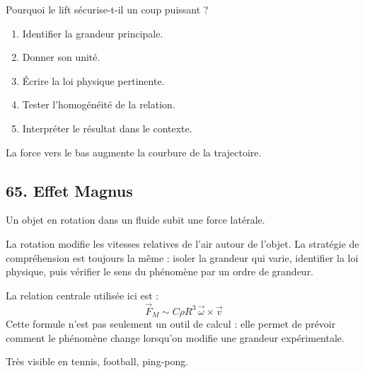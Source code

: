 \documentclass[11pt,a4paper]{article}
\begin{document}
\begin{exercicebox}
Pourquoi le lift sécurise-t-il un coup puissant ?
\begin{enumerate}
  \item Identifier la grandeur principale.
  \item Donner son unité.
  \item Écrire la loi physique pertinente.
  \item Tester l'homogénéité de la relation.
  \item Interpréter le résultat dans le contexte.
\end{enumerate}
\end{exercicebox}

\begin{corrigebox}[Indication]
La force vers le bas augmente la courbure de la trajectoire.
\end{corrigebox}


\subsection{65. Effet Magnus}

\begin{exemplebox}
Un objet en rotation dans un fluide subit une force latérale.
\end{exemplebox}

\begin{methodebox}
La rotation modifie les vitesses relatives de l'air autour de l'objet.
La stratégie de compréhension est toujours la même : isoler la grandeur qui varie, identifier la loi physique, puis vérifier le sens du phénomène par un ordre de grandeur.
\end{methodebox}

\begin{theorembox}
La relation centrale utilisée ici est :
\[
\vec F_M\sim C\rho R^3\,\vec\omega\times\vec v
\]
Cette formule n'est pas seulement un outil de calcul : elle permet de prévoir comment le phénomène change lorsqu'on modifie une grandeur expérimentale.
\end{theorembox}

\begin{odgbox}
Très visible en tennis, football, ping-pong.
\end{odgbox}
\end{document}
